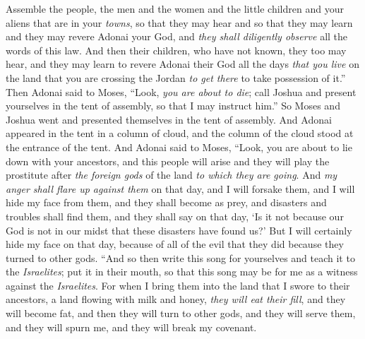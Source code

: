 \begin{biblechapter}
\verse Assemble the people, the men and the women and the little children and your aliens that are in your \textit{towns}, so that they may hear and so that they may learn and they may revere Adonai your God, and \textit{they shall diligently observe} all the words of this law.
\verse And then their children, who have not known, they too may hear, and they may learn to revere Adonai their God all the days \textit{that you live} on the land that you are crossing the Jordan \textit{to get there} to take possession of it.”
\verse Then Adonai said to Moses, “Look, \textit{you are about to die}; call Joshua and present yourselves in the tent of assembly, so that I may instruct him.” So Moses and Joshua went and presented themselves in the tent of assembly.
\verse And Adonai appeared in the tent in a column of cloud, and the column of the cloud stood at the entrance of the tent.
\verse And Adonai said to Moses, “Look, you are about to lie down with your ancestors, and this people will arise and they will play the prostitute after \textit{the foreign gods} of the land \textit{to which they are going}.
\verse And \textit{my anger shall flare up against them} on that day, and I will forsake them, and I will hide my face from them, and they shall become as prey, and disasters and troubles shall find them, and they shall say on that day, ‘Is it not because our God is not in our midst that these disasters have found us?’
\verse But I will certainly hide my face on that day, because of all of the evil that they did because they turned to other gods.
\verse “And so then write this song for yourselves and teach it to the \textit{Israelites}; put it in their mouth, so that this song may be for me as a witness against the \textit{Israelites}.
\verse For when I bring them into the land that I swore to their ancestors, a land flowing with milk and honey, \textit{they will eat their fill}, and they will become fat, and then they will turn to other gods, and they will serve them, and they will spurn me, and they will break my covenant.

\end{biblechapter}
